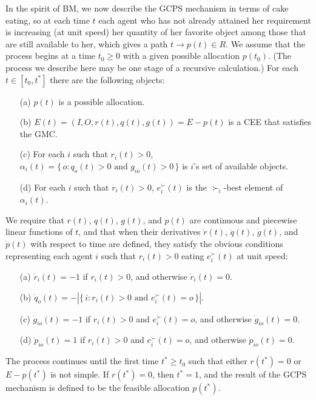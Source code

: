 \documentclass[12pt]{article}
\theoremstyle{definition}
\newcommand{\dr}{{\dot r}}
\newcommand{\dq}{{\dot q}}
\newcommand{\dg}{{\dot g}}
\newcommand{\ddp}{{\dot p}}
\begin{document}
In the spirit of BM, we now describe the GCPS mechanism in terms of cake eating, so at each time $t$ each agent who has not already attained her requirement is increasing (at unit speed) her quantity of her favorite object among those that are still available to her, which gives a path $t \to p(t) \in R$.  
We assume that the process begins at a time $t_0 \ge 0$ with a given possible allocation $p(t_0)$.  (The process we describe here may be one stage of a recursive calculation.)   
For each $t \in [t_0,t^*]$ there are the following objects:
\begin{enumerate}
  \item[(a)] $p(t)$ is a possible allocation.
  \item[(b)] $E(t) = (I,O,r(t),q(t),g(t)) = E - p(t)$ is a CEE that satisfies the GMC.
  \item[(c)] For each $i$ such that $r_i(t) > 0$, $\alpha_i(t) = \{\, o : \text{$q_o(t) > 0$ and $g_{io}(t) > 0$} \,\}$ is $i$'s set of available objects.
  \item[(d)] For each $i$ such that $r_i(t) > 0$, $e_i^\succ(t)$ is the $\succ_i$-best element of $\alpha_i(t)$.
\end{enumerate}
We require that $r(t)$, $q(t)$, $g(t)$, and $p(t)$ are continuous and piecewise linear functions of $t$, and that when their derivatives  $\dr(t)$, $\dq(t)$, $\dg(t)$, and $\ddp(t)$ with respect to time  are defined, they satisfy the obvious conditions representing each agent $i$ such that $r_i(t) > 0$ eating $e_i^\succ(t)$ at unit speed:
\begin{enumerate}
  \item[(a)] $\dr_i(t) = -1$ if $r_i(t) > 0$, and otherwise $\dr_i(t) = 0$.
  \item[(b)] $\dq_o(t) = -|\{\, i : \text{$r_i(t) > 0$ and $e_i^\succ(t) = o$} \,\}|$.
  \item[(c)] $\dg_{io}(t) = -1$ if $r_i(t) > 0$ and $e_i^\succ(t) = o$, and otherwise $\dg_{io}(t) = 0$.
  \item[(d)] $\ddp_{io}(t) = 1$ if $r_i(t) > 0$ and $e_i^\succ(t) = o$, and otherwise $\ddp_{io}(t) = 0$.
\end{enumerate}
The process continues until the first time $t^* \ge t_0$ such that either $r(t^*) = 0$ or $E - p(t^*)$ is not simple.   If $r(t^*) = 0$, then $t^* = 1$, and the result of the GCPS mechanism is defined to be the feasible allocation $p(t^*)$.
\end{document}
